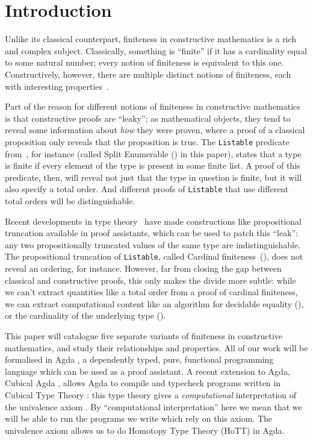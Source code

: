 \section{Introduction}
Unlike its classical counterpart, finiteness in constructive mathematics is a
rich and complex subject.
Classically, something is ``finite'' if it has a cardinality equal to some
natural number; every notion of finiteness is equivalent to this one.
Constructively, however, there are multiple distinct notions of finiteness, each
with interesting properties~\citep{coquandConstructivelyFinite2010,
  firsovVariationsNoetherianness2016, fruminFiniteSetsHomotopy2018}.

Part of the reason for different notions of finiteness in constructive
mathematics is that constructive proofs are ``leaky''; as mathematical
objects, they tend to reveal some information about \emph{how} they were proven,
where a proof of a classical proposition only reveals that the proposition is
true.
The \verb+Listable+ predicate
from~\citet{firsovDependentlyTypedProgramming2015}, for instance (called Split
Enumerable () in this paper),
states that a type is finite if every element of the type is present in some
finite list.
A proof of this predicate, then, will reveal not just that the type in question
is finite, but it will also specify a total order.
And different proofs of \verb+Listable+ that use different total orders will be
distinguishable.

Recent developments in type
theory~\citep[in particular Cubical Agda][]{vezzosiCubicalAgdaDependently2019}
have made constructions like propositional truncation available in proof
assistants, which
can be used to patch this ``leak'': any two propositionally truncated values of
the same type are indistinguishable.
The propositional truncation of \verb+Listable+, called Cardinal
finiteness~(), does not reveal an ordering, for instance.
However, far from closing the gap between classical and constructive proofs,
this only makes the divide more subtle: while we can't extract quantities like a
total order from a proof of cardinal finiteness, we can extract computational
content like an algorithm for decidable equality
(), or the cardinality of the underlying type
().

This paper will catalogue five separate variants of finiteness in constructive
mathematics, and study their relationships and properties.
All of our work will be formalised in Agda
\citep{norellDependentlyTypedProgramming2008}, a
dependently typed, pure, functional programming language which can be
used as a proof assistant.
A recent extension to Agda, Cubical Agda
\citep{vezzosiCubicalAgdaDependently2019}, allows Agda to compile and typecheck
programs written in Cubical Type Theory \citep{cohenCubicalTypeTheory2016}: this
type theory gives a \emph{computational} interpretation of the univalence axiom
\citep{hottbook}.
By ``computational interpretation'' here we mean that we will be able to run the
programs we write which rely on this axiom.
The univalence axiom allows us to do Homotopy Type Theory (HoTT) in Agda.

